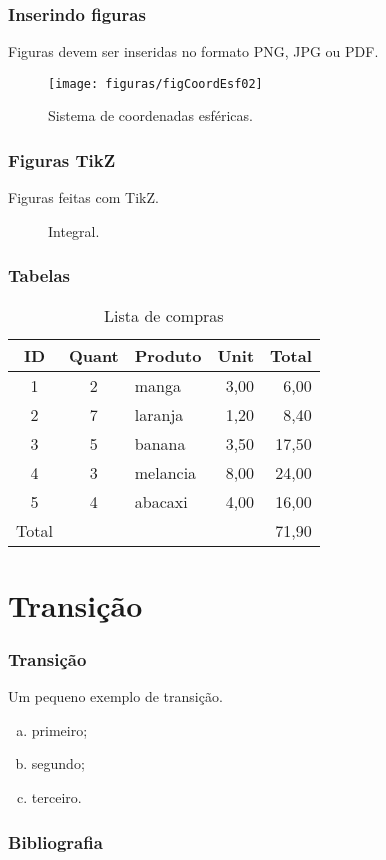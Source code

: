 \documentclass[aspectratio=169]{beamer}
\theoremstyle{Definition}
\begin{document}
\begin{frame}\frametitle{Inserindo figuras}
Figuras devem ser inseridas no formato PNG, JPG ou PDF.

  \begin{figure}[h]
    \centering
    \texttt{[image: figuras/figCoordEsf02]}
    \caption{Sistema de coordenadas esf\'ericas.}\label{figCoordEsf02}
  \end{figure}
\end{frame}

\begin{frame}\frametitle{Figuras TikZ}
Figuras feitas com TikZ.

  \begin{figure}[h]
    \centering
    
    \caption{Integral.}\label{figintegral}
  \end{figure}
\end{frame}

\begin{frame}\frametitle{Tabelas}
  \begin{table}
    \centering
    \begin{tabular}{cclrr}
      \toprule
      ID & Quant & Produto & Unit & Total\\
      \midrule
      1 & 2 & manga     & 3,00 & 6,00\\
      2 & 7 & laranja   & 1,20 & 8,40\\
      3 & 5 & banana    & 3,50 & 17,50\\
      4 & 3 & melancia  & 8,00 & 24,00\\
      5 & 4 & abacaxi   & 4,00 & 16,00\\
      \midrule
       Total &   &           &  & 71,90\\
      \bottomrule
    \end{tabular}
    \caption{Lista de compras}
  \end{table}
\end{frame}


\section{Transi\c c\~ao}

\begin{frame}\frametitle{Transi\c c\~ao}
Um pequeno exemplo de transi\c c\~ao.

\pause

\begin{enumerate}[a)]
  \item<2-> primeiro;
  \item<3-> segundo;
  \item<4-> terceiro.
\end{enumerate}
\end{frame}

\begin{frame}\frametitle{Bibliografia}
  
  
\end{frame}

\end{document}
